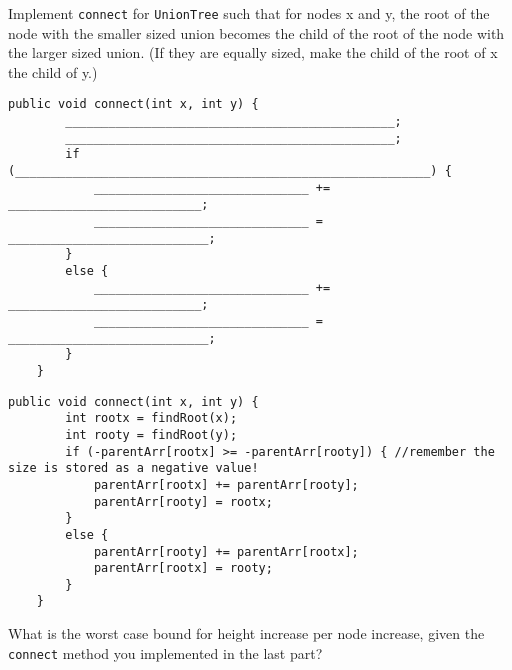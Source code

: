 \question Implement \lstinline$connect$ for \lstinline$UnionTree$ such that for nodes x and y, the root of the node with the smaller sized union becomes the child of the root of the node with the larger sized union. (If they are equally sized, make the child of the root of x the child of y.)

\begin{lstlisting} 
public void connect(int x, int y) {
        ______________________________________________;
        ______________________________________________;
        if (__________________________________________________________) { 
            ______________________________ += ___________________________;
            ______________________________ = ____________________________;
        }
        else {
            ______________________________ += ___________________________;
            ______________________________ = ____________________________;
        }
    }
\end{lstlisting}

\begin{solution}
\begin{lstlisting} 
public void connect(int x, int y) {
        int rootx = findRoot(x);
        int rooty = findRoot(y);
        if (-parentArr[rootx] >= -parentArr[rooty]) { //remember the size is stored as a negative value!
            parentArr[rootx] += parentArr[rooty];
            parentArr[rooty] = rootx; 
        }
        else {
            parentArr[rooty] += parentArr[rootx];
            parentArr[rootx] = rooty; 
        }
    }
\end{lstlisting}
\end{solution}

\question What is the worst case bound for height increase per node increase, given the \lstinline$connect$ method you implemented in the last part?


